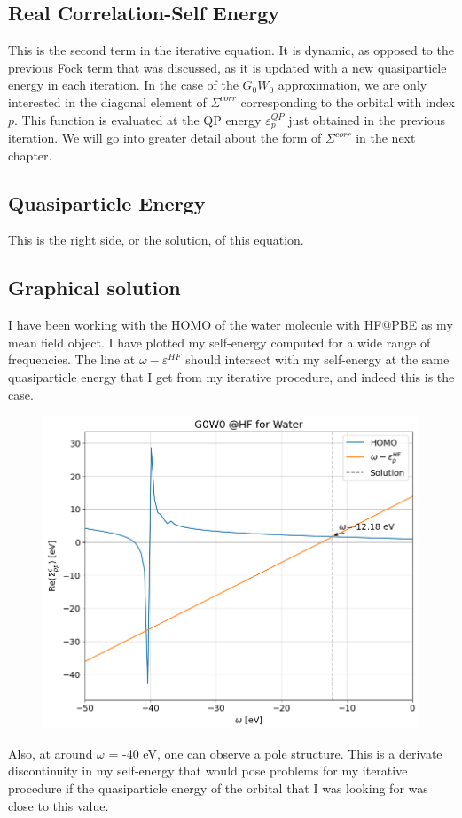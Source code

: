 \documentclass[12pt]{caltech_thesis}
\begin{document}
\subsection{Real Correlation-Self Energy}
This is the second term in the iterative equation. It is dynamic, as opposed to the previous Fock term that was discussed, as it is updated with a new quasiparticle energy in each iteration. In the case of the $G_0W_0$ approximation, we are only interested in the diagonal element of $\Sigma^{corr}$ corresponding to the orbital with index $p$. This function is evaluated at the QP energy $\varepsilon_{p}^{QP}$ just obtained in the previous iteration. We will go into greater detail about the form of $\Sigma^{corr}$ in the next chapter.
\subsection{Quasiparticle Energy}
This is the right side, or the solution, of this equation.
\newpage
\subsection{Graphical solution}
I have been working with the HOMO of the water molecule with HF@PBE as my mean field object. I have plotted my self-energy computed for a wide range of frequencies. The line at $\omega - \varepsilon^{HF}$ should intersect with my self-energy at the same quasiparticle energy that I get from my iterative procedure, and indeed this is the case.
\begin{figure}[h]
    \centering
    \includegraphics[width=\textwidth]{correlation_energies.png}
\end{figure}
Also, at around $\omega$ = -40 eV, one can observe a pole structure. This is a derivate discontinuity in my self-energy that would pose problems for my iterative procedure if the quasiparticle energy of the orbital that I was looking for was close to this value.
\end{document}
